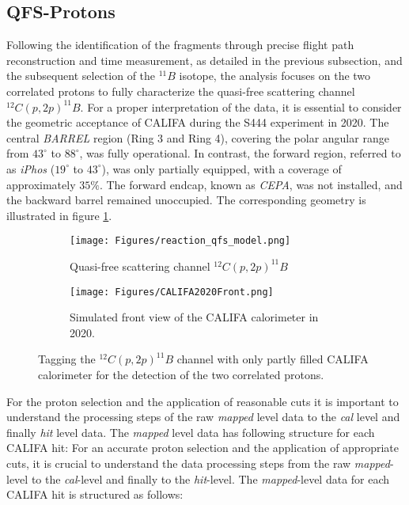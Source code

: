 \subsection{QFS-Protons}\label{sec:qfs_protons}
Following the identification of the fragments through precise flight path reconstruction and time measurement, as detailed in the previous subsection, and the subsequent selection of the $^{11}B$ isotope, the analysis focuses on the two correlated protons to fully characterize the quasi-free scattering channel $^{12}C(p,2p)^{11}B$.\newline
For a proper interpretation of the data, it is essential to consider the geometric acceptance of CALIFA during the S444 experiment in 2020. The central \textit{BARREL} region (Ring 3 and Ring 4), covering the polar angular range from $43^{\circ}$ to $88^{\circ}$, was fully operational. In contrast, the forward region, referred to as \textit{iPhos} ($19^{\circ}$ to $43^{\circ}$), was only partially equipped, with a coverage of approximately $35\%$. The forward endcap, known as \textit{CEPA}, was not installed, and the backward barrel remained unoccupied. The corresponding geometry is illustrated in figure \ref{fig:qfs_reac_and_geo}.\newline
\begin{figure}[htpb]
	\begin{subfigure}[t]{.4\linewidth}
    \texttt{[image: Figures/reaction\_qfs\_model.png]}
	\caption{Quasi-free scattering channel $^{12}C(p,2p)^{11}B$}
	\end{subfigure}
	\begin{subfigure}[t]{.4\linewidth}
    \texttt{[image: Figures/CALIFA2020Front.png]}
	\caption{Simulated front view of the CALIFA calorimeter in 2020.}
	\end{subfigure}
    \caption{Tagging the $^{12}C(p,2p)^{11}B$ channel with only partly filled CALIFA calorimeter for the detection of the two correlated protons.}%
    \label{fig:qfs_reac_and_geo}%
\end{figure}
For the proton selection and the application of reasonable cuts it is important to understand the processing steps of the raw \textit{mapped} level data to the \textit{cal} level and finally \textit{hit} level data. The \textit{mapped} level data has following structure for each CALIFA hit:
For an accurate proton selection and the application of appropriate cuts, it is crucial to understand the data processing steps from the raw \textit{mapped}-level to the \textit{cal}-level and finally to the \textit{hit}-level. The \textit{mapped}-level data for each CALIFA hit is structured as follows:
